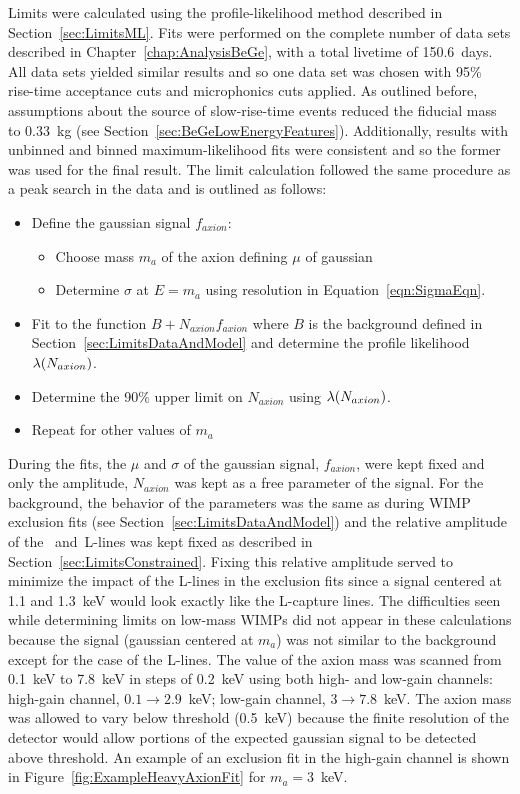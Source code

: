 	Limits were calculated using the profile-likelihood method described in Section~\ref{sec:LimitsML}.  Fits were performed on the complete number of data sets described in Chapter~\ref{chap:AnalysisBeGe}, with a total livetime of 150.6~days.  All data sets yielded similar results and so one data set was chosen with 95\% rise-time acceptance cuts and microphonics cuts applied.  As outlined before, assumptions about the source of slow-rise-time events reduced the fiducial mass to 0.33~kg (see Section~\ref{sec:BeGeLowEnergyFeatures}).  Additionally, results with unbinned and binned maximum-likelihood fits were consistent and so the former was used for the final result.  The limit calculation followed the same procedure as a peak search in the data and is outlined as follows:
		\begin{itemize}
			\item Define the gaussian signal $f_{axion}$: 
			\begin{itemize}
				\item Choose mass $m_{a}$ of the axion defining $\mu$ of gaussian
				\item Determine $\sigma$ at $E = m_{a}$ using resolution in Equation~\ref{eqn:SigmaEqn}.
			\end{itemize}
			\item Fit to the function $B + N_{axion} f_{axion}$ where $B$ is the background defined in Section~\ref{sec:LimitsDataAndModel} and determine the profile likelihood $\lambda(N_{axion})$.
			\item Determine the 90\% upper limit on $N_{axion}$ using $\lambda(N_{axion})$.
			\item Repeat for other values of $m_{a}$
		\end{itemize}		
	
	During the fits, the $\mu$ and $\sigma$ of the gaussian signal, $f_{axion}$, were kept fixed and only the amplitude, $N_{axion}$ was kept as a free parameter of the signal.  For the background, the behavior of the parameters was the same as during WIMP exclusion fits (see Section~\ref{sec:LimitsDataAndModel}) and the relative amplitude of the \gersixeight~and\znsixfive~L-lines was kept fixed as described in Section~\ref{sec:LimitsConstrained}.  Fixing this relative amplitude served to minimize the impact of the L-lines in the exclusion fits since a signal centered at 1.1 and 1.3~keV would look exactly like the L-capture lines.  The difficulties seen while determining limits on low-mass WIMPs did not appear in these calculations because the signal (gaussian centered at $m_{a}$) was not similar to the background except for the case of the L-lines.  The value of the axion mass was scanned from 0.1~keV to 7.8~keV in steps of 0.2~keV using both high- and low-gain channels: high-gain channel, $0.1\to2.9$~keV; low-gain channel, $3\to7.8$~keV.  The axion mass was allowed to vary below threshold (0.5~keV) because the finite resolution of the detector would allow portions of the expected gaussian signal to be detected above threshold.  An example of an exclusion fit in the high-gain channel is shown in Figure~\ref{fig:ExampleHeavyAxionFit} for $m_{a}=3$~keV.  

